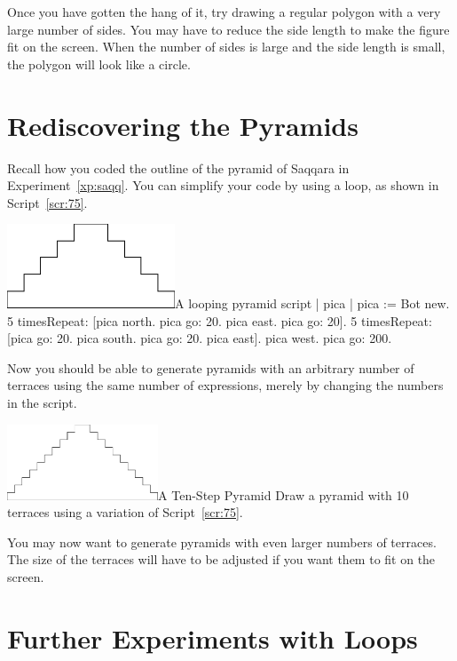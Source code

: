 \documentclass[a4paper,10pt,twoside]{book}
\begin{document}
Once you have gotten the hang of it, try drawing a regular polygon with a very large number of sides. You may have to reduce the side length to make the figure fit on the screen. When the number of sides is large and the side length is small, the polygon will look like a circle.


\section{Rediscovering the Pyramids} 

Recall how you coded the outline of the pyramid of Saqqara in Experiment~\ref{xp:saqq}. You can simplify 
your code by using a loop, as shown in Script~\ref{scr:75}. 


\begin{scriptfigwithsize}[0.4]{\includegraphics[width=5cm]{loopPyramid}}{A looping pyramid script}\label{scr:75}
| pica | 
pica := Bot new. 
5 timesRepeat: 
	[pica north. 
	pica go: 20. 
	pica east. 
	pica go: 20]. 
5 timesRepeat: 
	[pica go: 20. 
	pica south. 
	pica go: 20. 
	pica east]. 
pica west. 
pica go: 200. 
\end{scriptfigwithsize}

Now you should be able to generate pyramids with an arbitrary number of terraces using 
the same number of expressions, merely by changing the numbers in the script. 


\begin{exofigwithsizeandtitle}[0.55]{\includegraphics[width=4.5cm]{loopPyramid10}}{A Ten-Step Pyramid}
Draw a pyramid with 10 terraces using a variation of Script~\ref{scr:75}. 
\end{exofigwithsizeandtitle}

You may now want to generate pyramids with even larger numbers of terraces. The size of 
the terraces will have to be adjusted if you want them to fit on the screen. 


\section{Further Experiments with Loops} 
\end{document}
